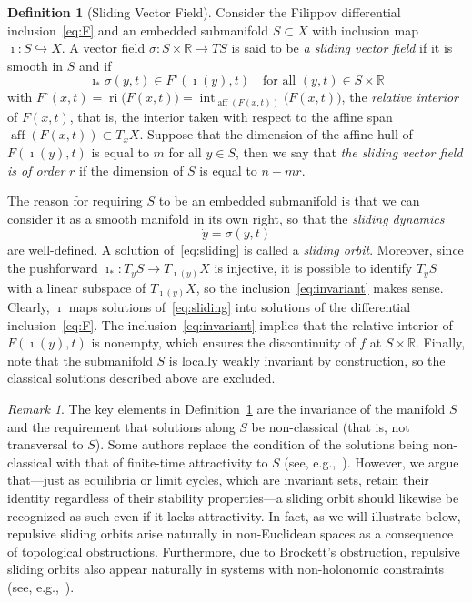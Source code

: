 \documentclass{article}
\theoremstyle{definition}
\newtheorem{definition}{Definition}
\theoremstyle{remark}
\newtheorem{remark}{Remark}
\newcommand{\MA}{X}	%
\newcommand{\RR}{\mathbb{R}}	%
\newcommand{\SW}{S}	%
\DeclareMathOperator{\aff}{aff}
\DeclareMathOperator{\interior}{int}
\DeclareMathOperator{\ri}{ri}
\begin{document}
\begin{definition}[Sliding Vector Field] \label{def:sliding}
 Consider the Filippov differential inclusion~\eqref{eq:F} and an embedded submanifold $\SW \subset \MA$ with inclusion map
 $\imath : \SW \hookrightarrow \MA$. A vector field $\sigma: \SW\times\RR \to T\SW$ is said to be 
 \emph{a sliding vector field} if it is smooth in $\SW$ and if
 \begin{equation} \label{eq:invariant}
  \imath_* \sigma(y,t) \in F^\circ(\imath(y),t) \quad \text{for all $(y,t) \in \SW\times \RR$}
 \end{equation}
 with $F^\circ(x,t) = \ri\big(F(x,t)\big) = \interior_{\aff(F(x,t))} \big(F(x,t)\big)$,
 the \emph{relative interior} of $F(x,t)$, that is, the interior taken with respect to the affine span $\aff(F(x,t)) \subset T_x\MA$.
 Suppose that the dimension of the affine hull of $F(\imath(y),t)$ is equal
 to $m$ for all $y \in \SW$, then we say that \emph{the sliding vector field is of order} $r$ if the dimension of $\SW$ is equal 
 to $n-m r$.
\end{definition}

The reason for requiring $\SW$ to be an embedded submanifold is that we can consider it as a smooth manifold in its own right, so that
the \emph{sliding dynamics}
\begin{equation} \label{eq:sliding}
 \dot{y} = \sigma(y,t)
\end{equation}
are well-defined. A solution of~\eqref{eq:sliding} is called a \emph{sliding orbit}. Moreover, since the pushforward
$\imath_* : T_y\SW \to T_{\imath(y)}\MA$ is injective, it is possible to identify $T_y\SW$ with a linear subspace of
$T_{\imath(y)}\MA$, so the inclusion~\eqref{eq:invariant} makes sense. Clearly, $\imath$ maps solutions
of~\eqref{eq:sliding} into solutions of the differential inclusion~\eqref{eq:F}. The inclusion~\eqref{eq:invariant}
implies that the relative interior of $F(\imath(y),t)$ is nonempty, which ensures the discontinuity of $f$ at $\SW\times\RR$. Finally, note
that the submanifold $\SW$ is locally weakly invariant by construction, so the classical solutions described above are excluded.

\begin{remark}
 The key elements in Definition~\ref{def:sliding} are the invariance of the manifold $\SW$ and the requirement that solutions along 
 $\SW$ be non-classical (that is, not transversal to $\SW$). Some authors replace the condition of the
 solutions being non-classical with that of finite-time attractivity to $\SW$ (see, e.g.,~\cite{utkin2020,utkin3}). However, we argue
 that---just as equilibria or limit cycles, which are invariant sets, retain their identity regardless of their stability
 properties---a sliding orbit should likewise be recognized as such even if it lacks attractivity.
 In fact, as we will illustrate below, repulsive sliding orbits arise naturally in non-Euclidean spaces as a consequence of
 topological obstructions. Furthermore, due to Brockett's obstruction, repulsive sliding orbits also appear naturally in systems
 with non-holonomic constraints (see, e.g.,~\cite{rocha2022}).
\end{remark}
\end{document}
